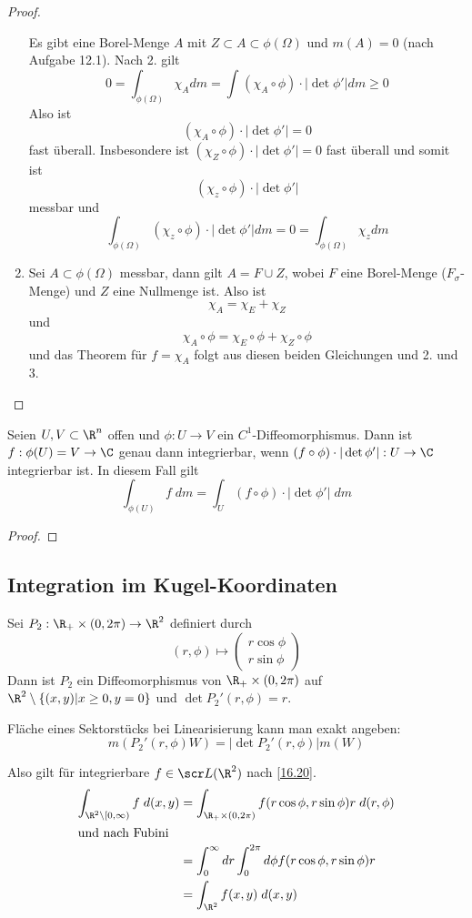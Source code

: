 \documentclass{mycourse}
\begin{document}
\begin{thm}
\begin{proof}
\begin{enumerate}
				Es gibt eine Borel-Menge $A$ mit $Z\subset A \subset \phi(\Omega)$ und $m(A)=0$ (nach Aufgabe 12.1).
				Nach 2. gilt
				\[
					0 = \int_{\phi(\Omega)} \chi_A dm = \int_{}(\chi_A \circ \phi) \cdot |\det \phi'| dm \ge 0
				\]
				Also ist
				\[
					(\chi_A \circ \phi)\cdot |\det \phi'| = 0
				\]
				fast überall.
				Insbesondere ist $(\chi_Z\circ \phi)\cdot |\det \phi'|=0$ fast überall und somit ist
				\[
					(\chi_z \circ \phi)\cdot |\det \phi'|
				\]
				messbar und
				\[
					\int_{\phi(\Omega)} (\chi_z \circ \phi)\cdot |\det \phi'| dm = 0 = \int_{\phi(\Omega)} \chi_z dm
				\]
			\item
				Sei $A\subset \phi(\Omega)$ messbar, dann gilt $A = F\cup Z$, wobei $F$ eine Borel-Menge ($F_\sigma$-Menge) und $Z$ eine Nullmenge ist.
				Also ist
				\[
					\chi_A = \chi_E + \chi_Z
				\]
				und
				\[
					\chi_A \circ \phi = \chi_E \circ \phi + \chi_Z \circ \phi
				\]
				und das Theorem für $f=\chi_A$ folgt aus diesen beiden Gleichungen und 2. und 3.
		\end{enumerate}
	\end{proof}
\end{thm}

\begin{kor}
	\label{16.20}
	Seien $U,V\subset \R^n$ offen und $\phi:U\to V$ ein $C^1$-Diffeomorphismus.
	Dann ist $f:\phi(U)=V \to \C$  genau dann integrierbar, wenn $(f\circ \phi)\cdot |\det \phi'| : U\to \C$ integrierbar ist.
	In diesem Fall gilt
	\[
		\int_{\phi(U)}f\;dm = \int_U (f\circ \phi)\cdot |\det \phi'| \; dm
	\]
	\begin{proof}
		\fixme[Übung]
	\end{proof}
\end{kor}


\subsection{Integration im Kugel-Koordinaten}

Sei $P_2 : \R_+ \times (0,2\pi)\to \R^2$ definiert durch
\[
	(r,\phi) \mapsto \begin{pmatrix}r\cos \phi\\ r\sin \phi\end{pmatrix}
\]
Dann ist $P_2$ ein Diffeomorphismus von $\R_+ \times (0,2\pi)$ auf $\R^2 \setminus \{(x,y) | x\ge 0, y= 0\}$ und
$\det P_2'(r,\phi) = r$.
\begin{note}
	Fläche eines Sektorstücks bei Linearisierung kann man exakt angeben:
	\[
		m(P_2'(r,\phi)W) = |\det P_2'(r,\phi)|m(W)
	\]
\end{note}
Also gilt für integrierbare $f\in \scr L(\R^2)$ nach \ref{16.20}.
\begin{align*}
	\int_{\R^2\setminus [0,\infty)}f\;d(x,y) &= \int_{\R_+\times (0,2\pi)}f(r\cos \phi, r\sin \phi) r \; d(r,\phi)\\
	\intertext{und nach Fubini}
	&= \int_0^\infty dr \int_0^{2\pi}d\phi f(r\cos \phi,r\sin \phi) r\\
	&= \int_{\R^2} f(x,y) \; d(x,y)
\end{align*}
\end{document}
